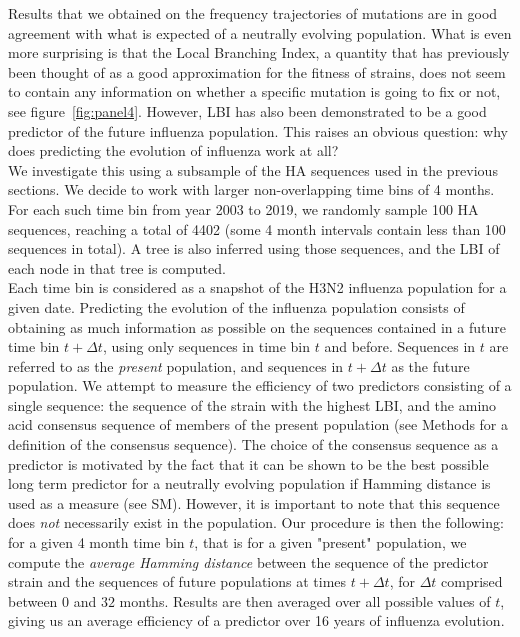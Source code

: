 \documentclass{article}
\begin{document}
	Results that we obtained on the frequency trajectories of mutations are in good agreement with what is expected of a neutrally evolving population. What is even more surprising is that the Local Branching Index, a quantity that has previously been thought of as a good approximation for the fitness of strains, does not seem to contain any information on whether a specific mutation is going to fix or not, see figure~\ref{fig:panel4}. However, LBI has also been demonstrated to be a good predictor of the  future influenza population. This raises an obvious question: why does predicting the evolution of influenza work at all? \\
	We investigate this using a subsample of the HA sequences used in the previous sections. We decide to work with larger non-overlapping time bins of 4 months. For each such time bin from year 2003 to 2019, we randomly sample 100 HA sequences, reaching a total of 4402 (some 4 month intervals contain less than 100 sequences in total). A tree is also inferred using those sequences, and the LBI of each node in that tree is computed.\\
	Each time bin is considered as a snapshot of the H3N2 influenza population for a given date. Predicting the evolution of the influenza population consists of obtaining as much information as possible on the sequences contained in a future time bin $t+\Delta t$, using only sequences in time bin $t$ and before. Sequences in $t$ are referred to as the \emph{present} population, and sequences in $t+\Delta t$ as the future population. We attempt to measure the efficiency of two predictors consisting of a single sequence: the sequence of the strain with the highest LBI, and the amino acid consensus sequence of members of the present population (see Methods for a definition of the consensus sequence). The choice of the consensus sequence as a predictor is motivated by the fact that it can be shown to be the best possible long term predictor for a neutrally evolving population if Hamming distance is used as a measure (see SM). However, it is important to note that this sequence does \emph{not} necessarily exist in the population. Our procedure is then the following: for a given 4 month time bin $t$, that is for a given "present" population, we compute the \emph{average Hamming distance} between the sequence of the predictor strain and the sequences of future populations at times $t+\Delta t$, for $\Delta t$ comprised between $0$ and $32$ months. Results are then averaged over all  possible values of $t$, giving us an average efficiency of a predictor over 16 years of influenza evolution. \\
\end{document}
